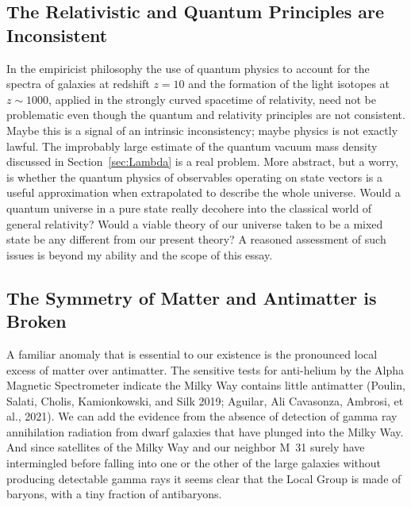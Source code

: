 \documentclass[fleqn,usenatbib]{mnras}
\begin{document}
\subsection{The Relativistic and Quantum Principles are Inconsistent}\label{sec:QM&GR}

In the empiricist philosophy the use of quantum physics to account for the spectra of galaxies at redshift $z=10$ and the formation of the light isotopes at $z\sim1000$, applied in the strongly curved spacetime of relativity, need not be problematic even though the quantum and relativity principles are not consistent.  Maybe this is a signal of an intrinsic inconsistency; maybe physics is not exactly lawful. The improbably large estimate of the quantum vacuum mass density discussed in Section~\ref{sec:Lambda} is a real problem. More abstract, but a worry, is whether the quantum physics of observables operating on state vectors is a useful approximation when extrapolated to describe the whole universe. Would a quantum universe in a pure state really decohere into the classical world of general relativity? Would a viable theory of our universe taken to be a mixed state be any different from our present theory? A reasoned assessment of such issues is beyond my ability and the scope of this essay. 


\subsection{The Symmetry of Matter and Antimatter is Broken}\label{sec:baryonnumber}

A familiar anomaly that is essential to our existence is the pronounced local excess of matter over antimatter. The sensitive tests for anti-helium by the Alpha Magnetic Spectrometer indicate the Milky Way contains little antimatter (Poulin, Salati, Cholis, Kamionkowski, and Silk 2019; Aguilar, Ali Cavasonza, Ambrosi, et al., 2021). We can add the evidence from the absence of detection of gamma ray annihilation radiation from dwarf  galaxies that have plunged into the Milky Way. And since satellites of the Milky Way and our neighbor M~31 surely have intermingled before falling into one or the other of the large galaxies without producing detectable gamma rays it seems clear that the Local Group is made of baryons, with a tiny fraction of antibaryons. 
\end{document}

